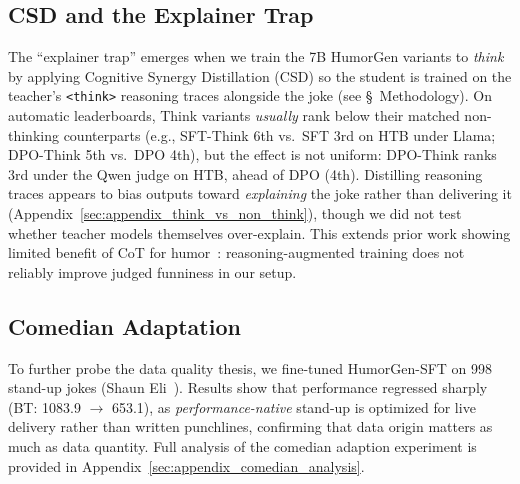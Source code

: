 \documentclass[11pt]{article}
\begin{document}
\subsection{CSD and the Explainer Trap}
\label{sec:results_csd}
The ``explainer trap'' emerges when we train the 7B HumorGen variants to \textit{think} by applying Cognitive Synergy Distillation (CSD) so the student is trained on the teacher's \texttt{<think>} reasoning traces alongside the joke (see \S~Methodology). On automatic leaderboards, Think variants \textit{usually} rank below their matched non-thinking counterparts (e.g., SFT-Think 6th vs.\ SFT 3rd on HTB under Llama; DPO-Think 5th vs.\ DPO 4th), but the effect is not uniform: DPO-Think ranks 3rd under the Qwen judge on HTB, ahead of DPO (4th). Distilling reasoning traces appears to bias outputs toward \textit{explaining} the joke rather than delivering it (Appendix~\ref{sec:appendix_think_vs_non_think}), though we did not test whether teacher models themselves over-explain. This extends prior work showing limited benefit of CoT for humor~\cite{zhong_lets_2024, tikhonov_humor_2024}: reasoning-augmented training does not reliably improve judged funniness in our setup.



\subsection{Comedian Adaptation}

To further probe the data quality thesis, we fine-tuned HumorGen-SFT on 998 stand-up jokes (Shaun Eli~\cite{eli_expired_comedy}). Results show that performance regressed sharply (BT: 1083.9 $\to$ 653.1), as \textit{performance-native} stand-up is optimized for live delivery rather than written punchlines, confirming that data origin matters as much as data quantity. Full analysis of the comedian adaption experiment is provided in Appendix~\ref{sec:appendix_comedian_analysis}.
\end{document}
